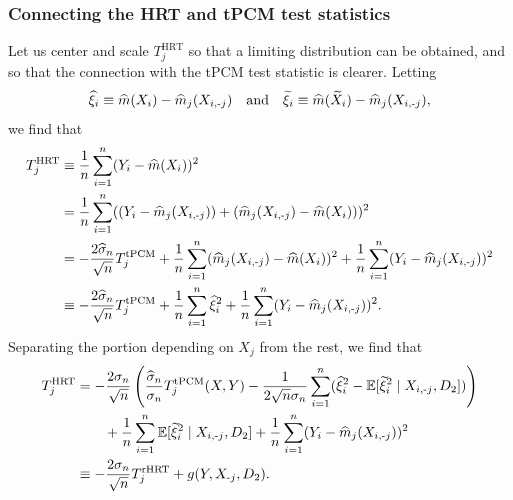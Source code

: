\documentclass[12pt]{article}
\theoremstyle{definition}
\theoremstyle{remark}
\newcommand{\E}{\mathbb E}								%
\newcommand{\srx}{X}									%
\newcommand{\sry}{Y}									%
\newcommand{\sxi}{\xi}							%
\newcommand{\minus}{\textnormal{-}} 						    %
\begin{document}
\subsubsection{Connecting the HRT and tPCM test statistics} \label{sec:connecting-HRT-PCM}

Let us center and scale $T_j^{\text{HRT}}$ so that a limiting distribution can be obtained, and so that the connection with the tPCM test statistic is clearer. Letting
\begin{equation}
\widehat \xi_i \equiv \widehat m(\srx_i) - \widehat m_j(\srx_{i, \minus j}) \quad \text{and} \quad \widetilde \xi_i \equiv \widehat m(\widetilde \srx_i) - \widehat m_j(\srx_{i, \minus j}),
\end{equation}
we find that 
\begin{equation}
\begin{split}
T_j^{\text{HRT}} &\equiv \frac{1}{n}\sum_{i = 1}^n (\sry_i - \widehat m(\srx_i))^2 \\
&= \frac{1}{n}\sum_{i = 1}^n ((\sry_i - \widehat m_j(\srx_{i, \minus j})) + (\widehat m_j(\srx_{i, \minus j}) - \widehat m(\srx_i)))^2 \\
&= -\frac{2\widehat \sigma_n}{\sqrt{n}} T_j^{\text{tPCM}} + \frac{1}{n}\sum_{i = 1}^n (\widehat m_j(\srx_{i, \minus j}) - \widehat m(\srx_i))^2 + \frac{1}{n}\sum_{i = 1}^n (\sry_i - \widehat m_j(\srx_{i, \minus j}))^2 \\
&\equiv -\frac{2\widehat \sigma_n}{\sqrt{n}} T_j^{\text{tPCM}} + \frac{1}{n}\sum_{i = 1}^n \widehat \sxi_i^2 + \frac{1}{n}\sum_{i = 1}^n (\sry_i - \widehat m_j(\srx_{i, \minus j}))^2.
\end{split}
\end{equation}
Separating the portion depending on $\srx_j$ from the rest, we find that
\begin{equation}
\begin{split}
T_j^{\text{HRT}}&= -\frac{2\sigma_n}{\sqrt{n}}\left(\frac{\widehat \sigma_n}{ \sigma_n} T^{\textnormal{tPCM}}_j (\srx,\sry)  - \frac{1}{2\sqrt n \sigma_n}\sum_{i=1}^n(\widehat \xi_i^2 - \E[\widetilde \xi_i^2 \mid \srx_{i,\minus j},  D_2])\right) \\
&\quad \quad + \frac{1}{n}\sum_{i = 1}^n \E[\widetilde \xi_i^2 \mid \srx_{i,\minus j},  D_2] + \frac{1}{n}\sum_{i = 1}^n (\sry_i - \widehat m_j(\srx_{i, \minus j}))^2 \\
&\equiv -\frac{2\sigma_n}{\sqrt{n}} T^{\textnormal{rHRT}}_j + g(\sry, \srx_{\minus j}, D_2).
\label{eq:hrt-tpcm-relationship}
\end{split}
\end{equation}
\end{document}
